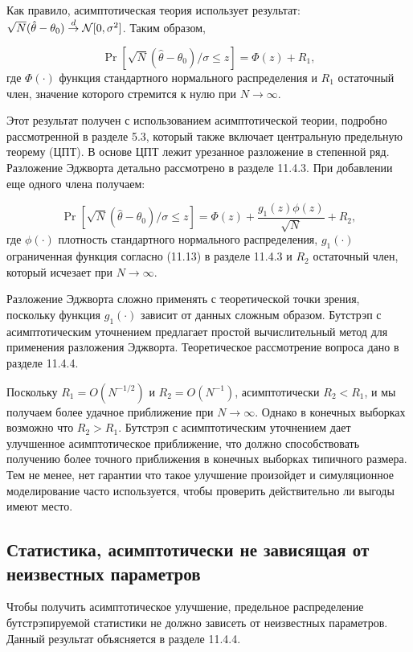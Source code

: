 Как правило, асимптотическая теория использует результат: $\sqrt{N}(\hat{\theta}-\theta_0) \stackrel{d}{\rightarrow} \mathcal{N}[0,\sigma^2]$. Таким образом, 

\begin{equation}
\Pr[\sqrt{N}(\hat{\theta}-\theta_0)/ \sigma \leq z] = \Phi(z)+R_1,
\end{equation}
где $\Phi(\cdot)$ функция стандартного нормального распределения и $R_1$ остаточный член, значение которого стремится к нулю при $N \rightarrow \infty$. 

Этот результат получен с использованием асимптотической теории, подробно рассмотренной в разделе 5.3, который также включает центральную предельную теорему (ЦПТ). В основе ЦПТ лежит урезанное разложение в степенной ряд. Разложение Эджворта детально рассмотрено в разделе 11.4.3. При добавлении еще одного члена получаем:

\begin{equation}
\Pr[\sqrt{N}(\hat{\theta}-\theta_0)/ \sigma \leq z] = \Phi(z)+\dfrac{g_1(z)\phi(z)}{\sqrt{N}}+R_2,
\end{equation}
где $\phi(\cdot)$ плотность стандартного нормального распределения, $g_1(\cdot)$ ограниченная функция согласно (11.13) в разделе 11.4.3 и $R_2$ остаточный член, который исчезает при $N \rightarrow \infty$.

Разложение Эджворта сложно применять с теоретической точки зрения, поскольку функция $g_1(\cdot)$ зависит от данных сложным образом. Бутстрэп с асимптотическим уточнением предлагает простой вычислительный метод для применения разложения Эджворта. Теоретическое рассмотрение вопроса дано в разделе 11.4.4.

Поскольку $R_1=O(N^{-1/2})$ и $R_2=O(N^{-1})$, асимптотически $R_2<R_1$, и мы получаем более удачное приближение при $N \rightarrow \infty$. Однако в конечных выборках возможно что $R_2>R_1$. Бутстрэп с асимптотическим уточнением дает улучшенное асимптотическое приближение, что должно способствовать получению более точного приближения в конечных выборках типичного размера. Тем не менее, нет гарантии что такое улучшение произойдет и симуляционное моделирование часто используется, чтобы проверить действительно ли выгоды имеют место.

\subsection{Статистика, асимптотически не зависящая от неизвестных параметров}

Чтобы получить асимптотическое улучшение, предельное распределение бутстрэпируемой статистики не должно зависеть от неизвестных параметров. Данный результат объясняется в разделе 11.4.4.

